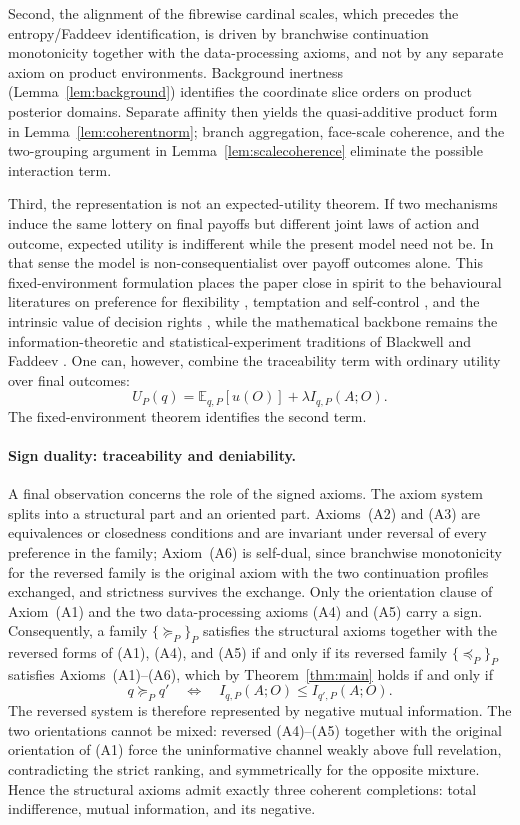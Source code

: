 \documentclass[11pt,a4paper]{article}
\theoremstyle{definition}
\newcommand{\E}{\mathbb E}
\newcommand{\1}{\mathbf 1}
\begin{document}
Second, the alignment of the fibrewise cardinal scales, which precedes the entropy/Faddeev identification, is driven by
branchwise continuation monotonicity together with the data-processing axioms, and not by any separate axiom on product
environments.  Background inertness (Lemma~\ref{lem:background}) identifies the coordinate slice orders on product
posterior domains.  Separate affinity then yields the quasi-additive product form in Lemma~\ref{lem:coherentnorm}; branch
aggregation, face-scale coherence, and the two-grouping argument in Lemma~\ref{lem:scalecoherence} eliminate the possible
interaction term.

Third, the representation is not an expected-utility theorem.  If two mechanisms induce the same lottery on final payoffs
but different joint laws of action and outcome, expected utility is indifferent while the present model need not be.  In that
sense the model is non-consequentialist over payoff outcomes alone.
This fixed-environment formulation places the paper close in spirit to the behavioural literatures on preference
for flexibility \cite{Kreps1979}, temptation and self-control \cite{GulPesendorfer2001}, and the intrinsic value of
decision rights \cite{BartlingFehrHerz2014}, while the mathematical backbone remains the information-theoretic and
statistical-experiment traditions of Blackwell \cite{Blackwell1953} and Faddeev \cite{Faddeev1956}.
One can, however, combine the traceability term with ordinary
utility over final outcomes:
\[
U_P(q)=\E_{q,P}[u(O)]+\lambda I_{q,P}(A;O).
\]
The fixed-environment theorem identifies the second term.

\paragraph{Sign duality: traceability and deniability.}
A final observation concerns the role of the signed axioms.  The axiom system splits into a structural part and an
oriented part.  Axioms~\textup{(A2)} and \textup{(A3)} are equivalences or closedness
conditions and are invariant under reversal of every preference in the family; Axiom~\textup{(A6)} is self-dual, since
branchwise monotonicity for the reversed family is the original axiom with the two continuation profiles exchanged, and
strictness survives the exchange.  Only the orientation clause of Axiom~\textup{(A1)} and the two data-processing axioms
\textup{(A4)} and \textup{(A5)} carry a sign.  Consequently, a family $\{\succeq_P\}_P$ satisfies the structural axioms
together with the reversed forms of \textup{(A1)}, \textup{(A4)}, and \textup{(A5)} if and only if its reversed family
$\{\preceq_P\}_P$ satisfies Axioms~\textup{(A1)--(A6)}, which by Theorem~\ref{thm:main} holds if and only if
\[
q\succeq_P q'
\quad\Longleftrightarrow\quad
I_{q,P}(A;O)\le I_{q',P}(A;O).
\]
The reversed system is therefore represented by negative mutual information.  The two orientations cannot be mixed:
reversed \textup{(A4)}--\textup{(A5)} together with the original orientation of \textup{(A1)} force the uninformative
channel weakly above full revelation, contradicting the strict ranking, and symmetrically for the opposite mixture.
Hence the structural axioms admit exactly three coherent completions: total indifference, mutual information, and its
negative.
\end{document}
